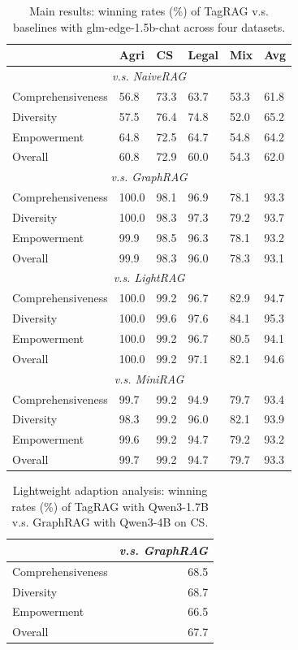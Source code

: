 \documentclass[11pt]{article}
\begin{document}
\begin{table}[h]
\centering
\small
\begin{tabularx}{0.48\textwidth}{lXXXXX}
\toprule
& Agri& CS& Legal& Mix & Avg\\ \midrule
\multicolumn{6}{c}{\textit{v.s. NaiveRAG}}\\ \midrule
Comprehensiveness & 56.8& 73.3& 63.7& 53.3 & 61.8 
\\
Diversity & 57.5& 76.4& 74.8& 52.0 & 65.2 
\\
Empowerment & 64.8& 72.5& 64.7& 54.8 & 64.2 
\\
Overall & 60.8& 72.9& 60.0& 54.3 & 62.0 \\ \midrule
\multicolumn{6}{c}{\textit{v.s. GraphRAG}}\\ \midrule
Comprehensiveness & 100.0& 98.1& 96.9& 78.1 & 93.3 
\\
Diversity & 100.0& 98.3& 97.3& 79.2 & 93.7 
\\
Empowerment & 99.9& 98.5& 96.3& 78.1 & 93.2 
\\
Overall & 99.9& 98.3& 96.0& 78.3 & 93.1 \\ \midrule
\multicolumn{6}{c}{\textit{v.s. LightRAG}}\\ \midrule
Comprehensiveness & 100.0& 99.2& 96.7& 82.9 & 94.7 
\\
Diversity & 100.0&  99.6& 97.6& 84.1 & 95.3 
\\
Empowerment & 100.0& 99.2& 96.7& 80.5 & 94.1 
\\
Overall & 100.0& 99.2& 97.1& 82.1 & 94.6 \\ \midrule
\multicolumn{6}{c}{\textit{v.s. MiniRAG}}\\ \midrule
Comprehensiveness & 99.7& 99.2& 94.9& 79.7 & 93.4 
\\
Diversity & 98.3& 99.2& 96.0& 82.1 & 93.9 
\\
Empowerment & 99.6& 99.2& 94.7& 79.2 & 93.2 
\\
Overall & 99.7& 99.2& 94.7& 79.7 & 93.3 \\
\bottomrule
\end{tabularx}
\caption{Main results: winning rates (\%) of TagRAG v.s. baselines with glm-edge-1.5b-chat across four datasets.}
\label{tab:main results glm-edge-1.5b-chat}
\end{table}



\begin{table}[t]
\centering
\begin{tabular}{lr}
\toprule
& \textit{v.s. GraphRAG} \\ \midrule
Comprehensiveness & 68.5\\
Diversity & 68.7\\
Empowerment & 66.5\\
Overall & 67.7\\  
\bottomrule
\end{tabular}
\caption{Lightweight adaption analysis: winning rates (\%) of TagRAG with Qwen3-1.7B v.s. GraphRAG with Qwen3-4B on CS.}
\label{tab:lightweight adaption analysis}
\end{table}
\end{document}
